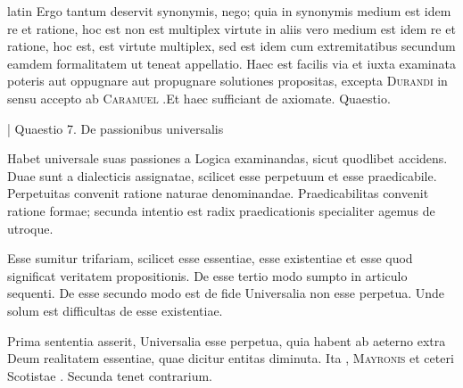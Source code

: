 \begin{otherlanguage*}{latin}
\pstart
 Ergo tantum deservit synonymis, nego; quia in synonymis medium est idem re et ratione, hoc est non est multiplex virtute in aliis vero medium est idem re et ratione, hoc est, est virtute multiplex, sed est idem cum extremitatibus secundum eamdem formalitatem ut teneat appellatio. Haec est facilis via et iuxta examinata poteris aut oppugnare aut propugnare solutiones propositas, excepta \textsc{Durandi} in sensu accepto ab \textsc{Caramuel} .Et haec sufficiant de axiomate. Quaestio. 
\pend

        \pstart
        \pend
      
\pstart
\noindent%
 \textnormal{|}  Quaestio 7. De passionibus universalis 
\pend

\pstart
 Habet universale suas passiones a Logica examinandas, sicut quodlibet accidens. Duae sunt a dialecticis assignatae, scilicet esse perpetuum et esse praedicabile. Perpetuitas convenit ratione naturae denominandae. Praedicabilitas convenit ratione formae; secunda intentio est radix praedicationis specialiter agemus de utroque. 
\pend

        \pstart
        \pend
      
\pstart
 Esse sumitur trifariam, scilicet esse essentiae, esse existentiae et esse quod significat veritatem propositionis. De esse tertio modo sumpto in articulo sequenti. De esse secundo modo est de fide Universalia non esse perpetua. Unde solum est difficultas de esse existentiae. 
\pend

\pstart
 Prima sententia asserit, Universalia esse perpetua, quia habent ab aeterno extra Deum realitatem essentiae, quae dicitur entitas diminuta. Ita , \textsc{Mayronis}\index[persons]{}  et ceteri Scotistae . Secunda tenet contrarium. 
\pend


\end{otherlanguage*}
